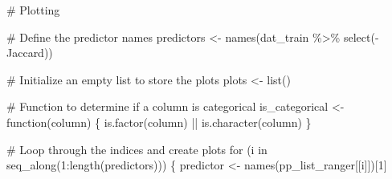\documentclass[
  letterpaper,
  DIV=11,
  numbers=noendperiod]{scrartcl}
\newenvironment{Shaded}{\begin{snugshade}}{\end{snugshade}}
\newcommand{\CommentTok}[1]{\textcolor[rgb]{0.37,0.37,0.37}{#1}}
\newcommand{\ControlFlowTok}[1]{\textcolor[rgb]{0.00,0.23,0.31}{#1}}
\newcommand{\DecValTok}[1]{\textcolor[rgb]{0.68,0.00,0.00}{#1}}
\newcommand{\FunctionTok}[1]{\textcolor[rgb]{0.28,0.35,0.67}{#1}}
\newcommand{\NormalTok}[1]{\textcolor[rgb]{0.00,0.23,0.31}{#1}}
\newcommand{\OtherTok}[1]{\textcolor[rgb]{0.00,0.23,0.31}{#1}}
\newcommand{\SpecialCharTok}[1]{\textcolor[rgb]{0.37,0.37,0.37}{#1}}
\begin{document}
\begin{Shaded}
\begin{Highlighting}[]
\CommentTok{\# Plotting}

\CommentTok{\# Define the predictor names}
\NormalTok{predictors }\OtherTok{\textless{}{-}} \FunctionTok{names}\NormalTok{(dat\_train }\SpecialCharTok{\%\textgreater{}\%} \FunctionTok{select}\NormalTok{(}\SpecialCharTok{{-}}\NormalTok{Jaccard))}

\CommentTok{\# Initialize an empty list to store the plots}
\NormalTok{plots }\OtherTok{\textless{}{-}} \FunctionTok{list}\NormalTok{()}

\CommentTok{\# Function to determine if a column is categorical}
\NormalTok{is\_categorical }\OtherTok{\textless{}{-}} \ControlFlowTok{function}\NormalTok{(column) \{}
  \FunctionTok{is.factor}\NormalTok{(column) }\SpecialCharTok{||} \FunctionTok{is.character}\NormalTok{(column)}
\NormalTok{\}}

\CommentTok{\# Loop through the indices and create plots}
\ControlFlowTok{for}\NormalTok{ (i }\ControlFlowTok{in} \FunctionTok{seq\_along}\NormalTok{(}\DecValTok{1}\SpecialCharTok{:}\FunctionTok{length}\NormalTok{(predictors))) \{}
\NormalTok{  predictor }\OtherTok{\textless{}{-}} \FunctionTok{names}\NormalTok{(pp\_list\_ranger[[i]])[}\DecValTok{1}\NormalTok{]}
  

\end{Highlighting}
\end{Shaded}
\end{document}
